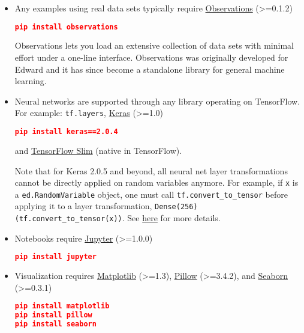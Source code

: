 \begin{itemize}
  \item Any examples using real data sets typically require
  \href{https://github.com/edwardlib/observations/}{Observations} (>=0.1.2)
\begin{lstlisting}[language=JSON]
pip install observations
\end{lstlisting}
Observations lets you load an extensive collection of data sets with
minimal effort under a one-line interface. Observations was originally
developed for Edward and it has since become a standalone library for
general machine learning.
  \item Neural networks are supported through any library operating
    on TensorFlow. For example:
  \texttt{tf.layers},
  \href{http://keras.io}{Keras} (>=1.0)
\begin{lstlisting}[language=JSON]
pip install keras==2.0.4
\end{lstlisting}
  and
  \href{https://github.com/tensorflow/tensorflow/tree/master/tensorflow/contrib/slim}{TensorFlow Slim}
  (native in TensorFlow).

Note that for Keras 2.0.5 and beyond, all neural net layer transformations cannot be directly applied on random variables anymore. For example, if \texttt{x} is a \texttt{ed.RandomVariable} object, one must call \texttt{tf.convert\_to\_tensor} before applying it to a layer transformation, \texttt{Dense(256)(tf.convert\_to\_tensor(x))}.  See \href{https://github.com/fchollet/keras/issues/6979}{here} for more details.
  \item Notebooks require
  \href{http://jupyter.org}{Jupyter} (>=1.0.0)
\begin{lstlisting}[language=JSON]
pip install jupyter
\end{lstlisting}
  \item Visualization requires
  \href{http://matplotlib.org}{Matplotlib} (>=1.3),
  \href{https://pillow.readthedocs.io}{Pillow} (>=3.4.2), and
  \href{https://seaborn.pydata.org}{Seaborn} (>=0.3.1)
\begin{lstlisting}[language=JSON]
pip install matplotlib
pip install pillow
pip install seaborn
\end{lstlisting}
\end{itemize}
